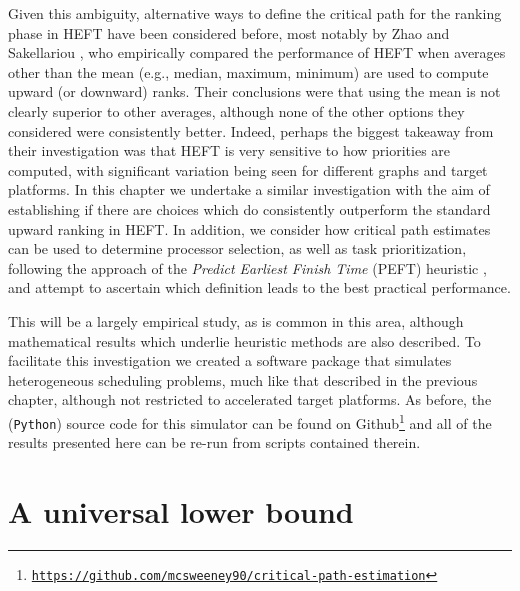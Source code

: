 \documentclass[12pt]{article}
\begin{document}
Given this ambiguity, alternative ways to define the critical path for the ranking phase in HEFT have been considered before, most notably by Zhao and Sakellariou \cite{zhao03}, who empirically compared the performance of HEFT when averages other than the mean (e.g., median, maximum, minimum) are used to compute upward (or downward) ranks. Their conclusions were that using the mean is not clearly superior to other averages, although none of the other options they considered were consistently better. Indeed, perhaps the biggest takeaway from their investigation was that HEFT is very sensitive to how priorities are computed, with significant variation being seen for different graphs and target platforms. In this chapter we undertake a similar investigation with the aim of establishing if there are choices which do consistently outperform the standard upward ranking in HEFT. In addition, we consider how critical path estimates can be used to determine processor selection, as well as task prioritization, following the approach of the {\em Predict Earliest Finish Time} (PEFT) heuristic \cite{arabnejad14}, and attempt to ascertain which definition leads to the best practical performance.        

This will be a largely empirical study, as is common in this area, although mathematical results which underlie heuristic methods are also described. To facilitate this investigation we created a software package that simulates heterogeneous scheduling problems, much like that described in the previous chapter, although not restricted to accelerated target platforms. As before, the ({\tt Python}) source code for this simulator can be found on Github\footnote{\href{https://github.com/mcsweeney90/critical-path-estimation}{{\tt \small https://github.com/mcsweeney90/critical-path-estimation}}} and all of the results presented here can be re-run from scripts contained therein. 


\section{A universal lower bound}
\label{sect.optimistic}
\end{document}
